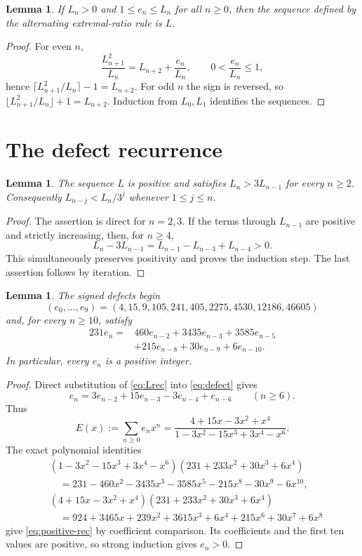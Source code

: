 \documentclass[11pt]{amsart}
\newtheorem{lemma}[theorem]{Lemma}
\theoremstyle{remark}
\begin{document}
\begin{lemma}\label{lem:rounding}
If $L_n>0$ and $1\le e_n\le L_n$ for all $n\ge0$, then the sequence
defined by the alternating extremal-ratio rule is $L$.
\end{lemma}
\begin{proof}
For even $n$,
\[
 \frac{L_{n+1}^2}{L_n}=L_{n+2}+\frac{e_n}{L_n},
 \qquad 0<\frac{e_n}{L_n}\le1,
\]
hence $\lceil L_{n+1}^2/L_n\rceil-1=L_{n+2}$.  For odd $n$ the sign is
reversed, so $\lfloor L_{n+1}^2/L_n\rfloor+1=L_{n+2}$.  Induction from
$L_0,L_1$ identifies the sequences.
\end{proof}

\section{The defect recurrence}
\begin{lemma}\label{lem:growth}
The sequence $L$ is positive and satisfies $L_n>3L_{n-1}$ for every $n\ge2$.
Consequently $L_{n-j}<L_n/3^j$ whenever $1\le j\le n$.
\end{lemma}
\begin{proof}
The assertion is direct for $n=2,3$.  If the terms through $L_{n-1}$ are
positive and strictly increasing, then, for $n\ge4$,
\[
 L_n-3L_{n-1}=L_{n-1}-L_{n-3}+L_{n-4}>0.
\]
This simultaneously preserves positivity and proves the induction step.  The
last assertion follows by iteration.
\end{proof}

\begin{lemma}\label{lem:defectrec}
The signed defects begin
\[
(e_0,\ldots,e_9)=(4,15,9,105,241,405,2275,4530,12186,46605)
\]
and, for every $n\ge10$, satisfy
\begin{equation}\label{eq:positive-rec}
\begin{split}
231e_n={}&460e_{n-2}+3435e_{n-3}+3585e_{n-5}\\
&+215e_{n-8}+30e_{n-9}+6e_{n-10}.
\end{split}
\end{equation}
In particular, every $e_n$ is a positive integer.
\end{lemma}
\begin{proof}
Direct substitution of \eqref{eq:Lrec} into \eqref{eq:defect} gives
\begin{equation}\label{eq:six-rec}
 e_n=3e_{n-2}+15e_{n-3}-3e_{n-4}+e_{n-6}\qquad(n\ge6).
\end{equation}
Thus
\[
 E(x):=\sum_{n\ge0}e_nx^n
 =\frac{4+15x-3x^2+x^4}{1-3x^2-15x^3+3x^4-x^6}.
\]
The exact polynomial identities
\begin{align*}
&(1-3x^2-15x^3+3x^4-x^6)(231+233x^2+30x^3+6x^4)\\
&\quad=231-460x^2-3435x^3-3585x^5-215x^8-30x^9-6x^{10},\\
&(4+15x-3x^2+x^4)(231+233x^2+30x^3+6x^4)\\
&\quad=924+3465x+239x^2+3615x^3+6x^4+215x^6+30x^7+6x^8
\end{align*}
give \eqref{eq:positive-rec} by coefficient comparison.  Its coefficients and
the first ten values are positive, so strong induction gives $e_n>0$.
\end{proof}
\end{document}
